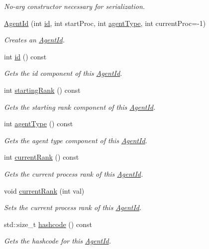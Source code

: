 \begin{DoxyCompactItemize}
\begin{DoxyCompactList}\small\item\em No-\/arg constructor necessary for serialization. \end{DoxyCompactList}\item 
\hyperlink{classrepast_1_1_agent_id_aedbcc79ba8794ec1d0e7cfb3e7bee83d}{Agent\-Id} (int \hyperlink{classrepast_1_1_agent_id_af8482957f7cc22c0b79b7c62680af219}{id}, int start\-Proc, int \hyperlink{classrepast_1_1_agent_id_a2e28383a437cf176a596783288227e28}{agent\-Type}, int current\-Proc=-\/1)
\begin{DoxyCompactList}\small\item\em Creates an \hyperlink{classrepast_1_1_agent_id}{Agent\-Id}. \end{DoxyCompactList}\item 
int \hyperlink{classrepast_1_1_agent_id_af8482957f7cc22c0b79b7c62680af219}{id} () const 
\begin{DoxyCompactList}\small\item\em Gets the id component of this \hyperlink{classrepast_1_1_agent_id}{Agent\-Id}. \end{DoxyCompactList}\item 
int \hyperlink{classrepast_1_1_agent_id_a8f085b7feffaa55fb958f6b78a76ec43}{starting\-Rank} () const 
\begin{DoxyCompactList}\small\item\em Gets the starting rank component of this \hyperlink{classrepast_1_1_agent_id}{Agent\-Id}. \end{DoxyCompactList}\item 
int \hyperlink{classrepast_1_1_agent_id_a2e28383a437cf176a596783288227e28}{agent\-Type} () const 
\begin{DoxyCompactList}\small\item\em Gets the agent type component of this \hyperlink{classrepast_1_1_agent_id}{Agent\-Id}. \end{DoxyCompactList}\item 
int \hyperlink{classrepast_1_1_agent_id_a2cd64629db02df00ff9718b99f42059f}{current\-Rank} () const 
\begin{DoxyCompactList}\small\item\em Gets the current process rank of this \hyperlink{classrepast_1_1_agent_id}{Agent\-Id}. \end{DoxyCompactList}\item 
void \hyperlink{classrepast_1_1_agent_id_ae55db02b1adb2bf1906fb3356bbc4b21}{current\-Rank} (int val)
\begin{DoxyCompactList}\small\item\em Sets the current process rank of this \hyperlink{classrepast_1_1_agent_id}{Agent\-Id}. \end{DoxyCompactList}\item 
std\-::size\-\_\-t \hyperlink{classrepast_1_1_agent_id_adaf9d5613b079105f0973f7a4eecd86d}{hashcode} () const 
\begin{DoxyCompactList}\small\item\em Gets the hashcode for this \hyperlink{classrepast_1_1_agent_id}{Agent\-Id}. \end{DoxyCompactList}\end{DoxyCompactItemize}
